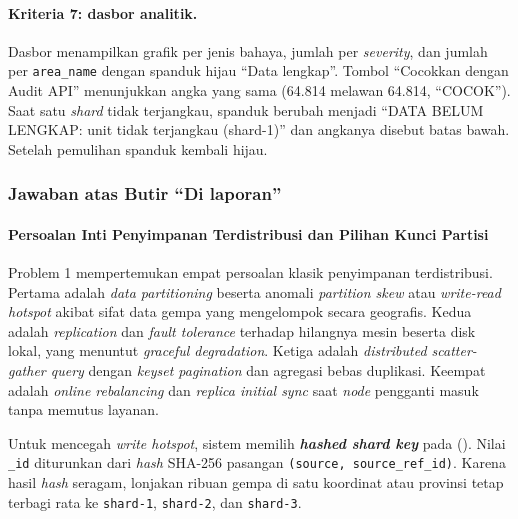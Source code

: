 \paragraph*{Kriteria 7: dasbor analitik.}
Dasbor menampilkan grafik per jenis bahaya, jumlah per \textit{severity}, dan jumlah per \texttt{area\_name} dengan spanduk hijau ``Data lengkap''. Tombol ``Cocokkan dengan Audit API'' menunjukkan angka yang sama (64.814 melawan 64.814, ``COCOK''). Saat satu \textit{shard} tidak terjangkau, spanduk berubah menjadi ``DATA BELUM LENGKAP: unit tidak terjangkau (shard-1)'' dan angkanya disebut batas bawah. Setelah pemulihan spanduk kembali hijau.

\subsubsection{Jawaban atas Butir ``Di laporan''}

\paragraph*{Persoalan Inti Penyimpanan Terdistribusi dan Pilihan Kunci Partisi}
Problem 1 mempertemukan empat persoalan klasik penyimpanan terdistribusi. Pertama adalah \textit{data partitioning} beserta anomali \textit{partition skew} atau \textit{write-read hotspot} akibat sifat data gempa yang mengelompok secara geografis. Kedua adalah \textit{replication} dan \textit{fault tolerance} terhadap hilangnya mesin beserta disk lokal, yang menuntut \textit{graceful degradation}. Ketiga adalah \textit{distributed scatter-gather query} dengan \textit{keyset pagination} dan agregasi bebas duplikasi. Keempat adalah \textit{online rebalancing} dan \textit{replica initial sync} saat \textit{node} pengganti masuk tanpa memutus layanan.

Untuk mencegah \textit{write hotspot}, sistem memilih \textit{\textbf{hashed shard key}} pada  (). Nilai \texttt{\_id} diturunkan dari \textit{hash} SHA-256 pasangan \texttt{(source, source\_ref\_id)}. Karena hasil \textit{hash} seragam, lonjakan ribuan gempa di satu koordinat atau provinsi tetap terbagi rata ke \texttt{shard-1}, \texttt{shard-2}, dan \texttt{shard-3}.

